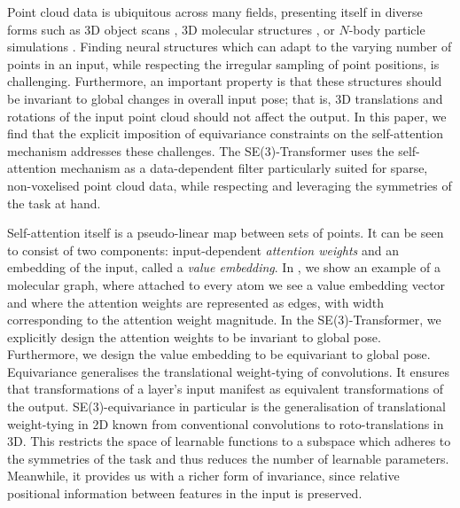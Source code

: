 \documentclass{article}
\begin{document}
Point cloud data is ubiquitous across many fields, presenting itself in diverse forms such as 3D object scans \citep{uy-scanobjectnn-iccv19}, 3D molecular structures \citep{RamakrishnanDRvL14}, or $N$-body particle simulations \citep{KipfFWWZ18}. Finding neural structures which can adapt to the varying number of points in an input, while respecting the irregular sampling of point positions, is challenging. Furthermore, an important property is that these structures should be invariant to global changes in overall input pose; that is, 3D translations and rotations of the input point cloud should not affect the output. In this paper, we find that the explicit imposition of equivariance constraints on the self-attention mechanism addresses these challenges. The SE(3)-Transformer uses the self-attention mechanism as a data-dependent filter particularly suited for sparse, non-voxelised point cloud data, while respecting and leveraging the symmetries of the task at hand. 

Self-attention itself is a pseudo-linear map between sets of points. It can be seen to consist of two components: input-dependent \emph{attention weights} and an embedding of the input, called a \emph{value embedding}. In , we show an example of a molecular graph, where attached to every atom we see a value embedding vector and where the attention weights are represented as edges, with width corresponding to the attention weight magnitude. In the SE(3)-Transformer, we explicitly design the attention weights to be invariant to global pose. Furthermore, we design the value embedding to be equivariant to global pose. Equivariance generalises the translational weight-tying of convolutions. It ensures that transformations of a layer's input manifest as equivalent transformations of the output. SE(3)-equivariance in particular is the generalisation of translational weight-tying in 2D known from conventional convolutions to roto-translations in 3D.
This restricts the space of learnable functions to a subspace which adheres to the symmetries of the task and thus reduces the number of learnable parameters.
Meanwhile, it provides us with a richer form of invariance, since relative positional information between features in the input is preserved.
\end{document}
